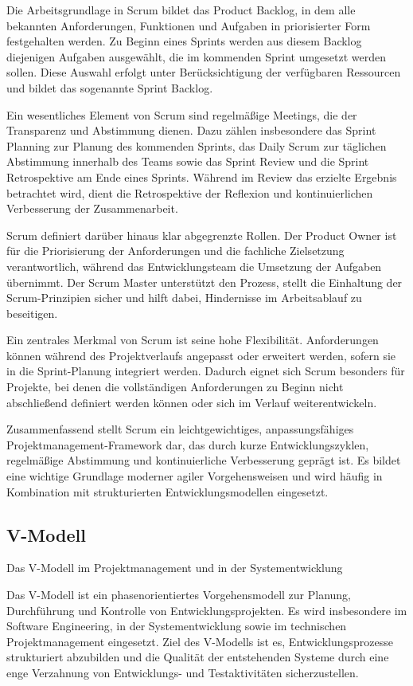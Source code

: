 Die Arbeitsgrundlage in Scrum bildet das Product Backlog, in dem alle bekannten Anforderungen, Funktionen und Aufgaben in priorisierter Form festgehalten werden. Zu Beginn eines Sprints werden aus diesem Backlog diejenigen Aufgaben ausgewählt, die im kommenden Sprint umgesetzt werden sollen. Diese Auswahl erfolgt unter Berücksichtigung der verfügbaren Ressourcen und bildet das sogenannte Sprint Backlog. 

Ein wesentliches Element von Scrum sind regelmäßige Meetings, die der Transparenz und Abstimmung dienen. Dazu zählen insbesondere das Sprint Planning zur Planung des kommenden Sprints, das Daily Scrum zur täglichen Abstimmung innerhalb des Teams sowie das Sprint Review und die Sprint Retrospektive am Ende eines Sprints. Während im Review das erzielte Ergebnis betrachtet wird, dient die Retrospektive der Reflexion und kontinuierlichen Verbesserung der Zusammenarbeit.

Scrum definiert darüber hinaus klar abgegrenzte Rollen. Der Product Owner ist für die Priorisierung der Anforderungen und die fachliche Zielsetzung verantwortlich, während das Entwicklungsteam die Umsetzung der Aufgaben übernimmt. Der Scrum Master unterstützt den Prozess, stellt die Einhaltung der Scrum-Prinzipien sicher und hilft dabei, Hindernisse im Arbeitsablauf zu beseitigen.

Ein zentrales Merkmal von Scrum ist seine hohe Flexibilität. Anforderungen können während des Projektverlaufs angepasst oder erweitert werden, sofern sie in die Sprint-Planung integriert werden. Dadurch eignet sich Scrum besonders für Projekte, bei denen die vollständigen Anforderungen zu Beginn nicht abschließend definiert werden können oder sich im Verlauf weiterentwickeln. \cite{schwaber2020scrumguide}

Zusammenfassend stellt Scrum ein leichtgewichtiges, anpassungsfähiges Projektmanagement-Framework dar, das durch kurze Entwicklungszyklen, regelmäßige Abstimmung und kontinuierliche Verbesserung geprägt ist. Es bildet eine wichtige Grundlage moderner agiler Vorgehensweisen und wird häufig in Kombination mit strukturierten Entwicklungsmodellen eingesetzt.


\subsection{V-Modell}
\label{cha:V-Modell}

Das V-Modell im Projektmanagement und in der Systementwicklung

Das V-Modell ist ein phasenorientiertes Vorgehensmodell zur Planung, Durchführung und Kontrolle von Entwicklungsprojekten. Es wird insbesondere im Software Engineering, in der Systementwicklung sowie im technischen Projektmanagement eingesetzt. Ziel des V-Modells ist es, Entwicklungsprozesse strukturiert abzubilden und die Qualität der entstehenden Systeme durch eine enge Verzahnung von Entwicklungs- und Testaktivitäten sicherzustellen. \cite{friedrich2024vmodellxt}\cite{cioBund2023vmodellxt}

